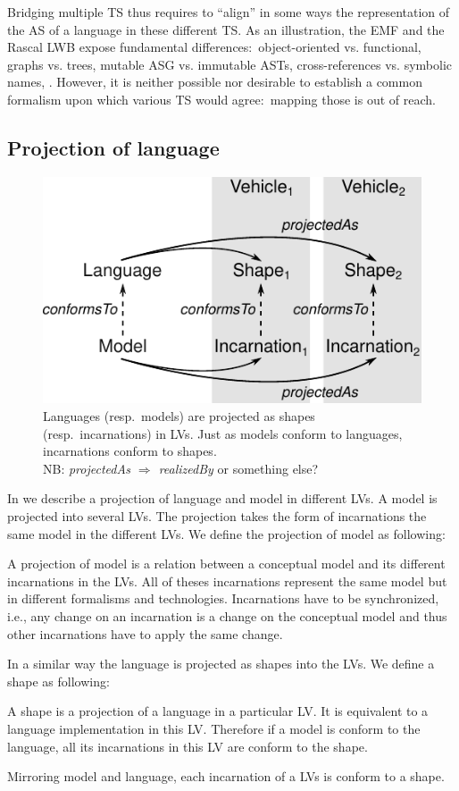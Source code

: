 Bridging multiple TS thus requires to ``align'' in some ways the representation of the AS of a language in these different TS.
As an illustration, the EMF and the Rascal LWB expose fundamental differences:~object-oriented vs. functional, graphs vs. trees, mutable ASG vs. immutable ASTs, cross-references vs. symbolic names, \etc.
However, it is neither possible nor desirable to establish a common formalism upon which various TS would agree:~mapping those is out of reach.

\subsection{Projection of language}

\begin{figure}
	\centering
	\includegraphics[width=.8\columnwidth]{figures/concepts}
	\caption{Languages (resp.~models) are projected as shapes (resp.~incarnations) in LVs. Just as models conform to languages, incarnations conform to shapes.\\NB: \emph{projectedAs $\Rightarrow$ realizedBy} or something else?}
	\label{fig:concepts}
\end{figure}

In  we describe a projection of language and model in different LVs.
A model is projected into several LVs.
The projection takes the form of incarnations the same model in the different LVs.
We define the projection of model as following:
\begin{definition}
A projection of model is a relation between a conceptual model and its different incarnations in the LVs.
All of theses incarnations represent the same model but in different formalisms and technologies.
Incarnations have to be synchronized, i.e., any change on an incarnation is a change on the conceptual model and thus other incarnations have to apply the same change.
\end{definition}
In a similar way the language is projected as shapes into the LVs.
We define a shape as following:
\begin{definition}
A shape is a projection of a language in a particular LV.
It is equivalent to a language implementation in this LV.
Therefore if a model is conform to the language, all its incarnations in this LV are conform to the shape.
\end{definition}
Mirroring model and language, each incarnation of a LVs is conform to a shape.

